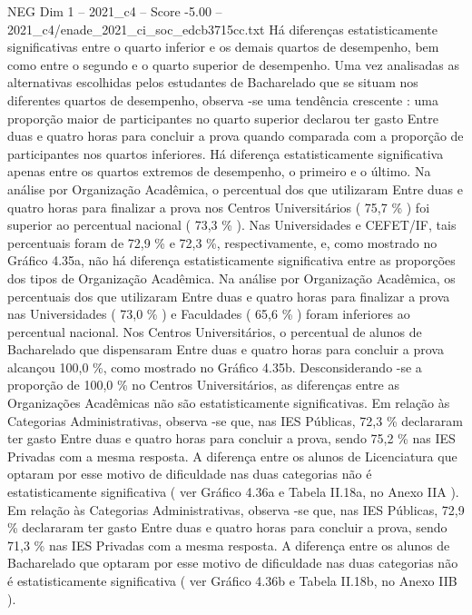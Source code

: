 \begin{textsample}{NEG Dim 1 – 2021\_c4 – Score -5.00 – 2021\_c4/enade\_2021\_ci\_soc\_edcb3715cc.txt}
Há diferenças estatisticamente significativas entre o quarto inferior e os demais quartos de desempenho, bem como entre o segundo e o quarto superior de desempenho.
Uma vez analisadas as alternativas escolhidas pelos estudantes de Bacharelado que se situam nos diferentes quartos de desempenho, observa -se uma tendência crescente : uma proporção maior de participantes no quarto superior declarou ter gasto Entre duas e quatro horas para concluir a prova quando comparada com a proporção de participantes nos quartos inferiores.
Há diferença estatisticamente significativa apenas entre os quartos extremos de desempenho, o primeiro e o último.
Na análise por Organização Acadêmica, o percentual dos que utilizaram Entre duas e quatro horas para finalizar a prova nos Centros Universitários ( 75,7 \% ) foi superior ao percentual nacional ( 73,3 \% ).
Nas Universidades e CEFET/IF, tais percentuais foram de 72,9 \% e 72,3 \%, respectivamente, e, como mostrado no Gráfico 4.35a, não há diferença estatisticamente significativa entre as proporções dos tipos de Organização Acadêmica.
Na análise por Organização Acadêmica, os percentuais dos que utilizaram Entre duas e quatro horas para finalizar a prova nas Universidades ( 73,0 \% ) e Faculdades ( 65,6 \% ) foram inferiores ao percentual nacional.
Nos Centros Universitários, o percentual de alunos de Bacharelado que dispensaram Entre duas e quatro horas para concluir a prova alcançou 100,0 \%, como mostrado no Gráfico 4.35b.
Desconsiderando -se a proporção de 100,0 \% no Centros Universitários, as diferenças entre as Organizações Acadêmicas não são estatisticamente significativas.
Em relação às Categorias Administrativas, observa -se que, nas IES Públicas, 72,3 \% declararam ter gasto Entre duas e quatro horas para concluir a prova, sendo 75,2 \% nas IES Privadas com a mesma resposta.
A diferença entre os alunos de Licenciatura que optaram por esse motivo de dificuldade nas duas categorias não é estatisticamente significativa ( ver Gráfico 4.36a e Tabela II.18a, no Anexo IIA ).
Em relação às Categorias Administrativas, observa -se que, nas IES Públicas, 72,9 \% declararam ter gasto Entre duas e quatro horas para concluir a prova, sendo 71,3 \% nas IES Privadas com a mesma resposta.
A diferença entre os alunos de Bacharelado que optaram por esse motivo de dificuldade nas duas categorias não é estatisticamente significativa ( ver Gráfico 4.36b e Tabela II.18b, no Anexo IIB ).

\end{textsample}
